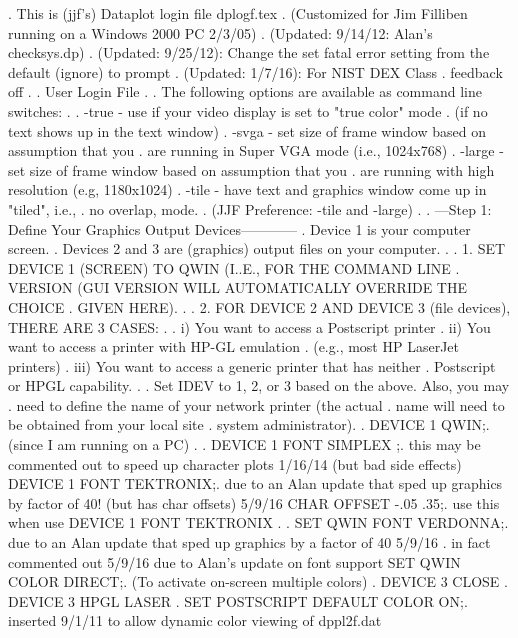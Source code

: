 . This is (jjf's) Dataplot login file dplogf.tex
. (Customized for Jim Filliben running on a Windows 2000 PC  2/3/05)
. (Updated: 9/14/12:  Alan's checksys.dp)
. (Updated: 9/25/12): Change the   set fatal error   setting from the default (ignore) to prompt
. (Updated: 1/7/16):  For NIST DEX Class
.
feedback off
.
.  User Login File
.
.  The following options are available as command line switches:
.
.  -true    - use if your video display is set to "true color" mode
.             (if no text shows up in the text window)
.  -svga    - set size of frame window based on assumption that you
.             are running in Super VGA mode (i.e., 1024x768)
.  -large   - set size of frame window based on assumption that you
.             are running with high resolution (e.g, 1180x1024)
.  -tile    - have text and graphics window come up in "tiled", i.e.,
.             no overlap, mode.
.  (JJF Preference: -tile and -large)
.
. ---Step 1: Define Your Graphics Output Devices------------
.      Device 1 is your computer screen.
.      Devices 2 and 3 are (graphics) output files on your computer.
.
.         1. SET DEVICE 1 (SCREEN) TO QWIN (I..E., FOR THE COMMAND LINE
.            VERSION (GUI VERSION WILL AUTOMATICALLY OVERRIDE THE CHOICE
.            GIVEN HERE).
.
.         2. FOR DEVICE 2 AND DEVICE 3 (file devices), THERE ARE 3 CASES:
.
.              i) You want to access a Postscript printer
.             ii) You want to access a printer with HP-GL emulation
.                 (e.g., most HP LaserJet printers)
.            iii) You want to access a generic printer that has neither
.                 Postscript or HPGL capability.
.
.            Set IDEV to 1, 2, or 3 based on the above.  Also, you may
.            need to define the name of your network printer (the actual
.            name will need to be obtained from your local site
.            system administrator).
.
DEVICE 1 QWIN;. (since I am running on a PC)
.
. DEVICE 1 FONT SIMPLEX   ;. this may be commented out to speed up character plots 1/16/14 (but bad side effects)
DEVICE 1 FONT TEKTRONIX;. due to an Alan update that sped up graphics by factor of 40! (but has char offsets) 5/9/16
CHAR OFFSET -.05 .35;. use this when use DEVICE 1 FONT TEKTRONIX
.
. SET QWIN FONT VERDONNA;.  due to an Alan update that sped up graphics by a factor of 40   5/9/16
.          in fact commented out 5/9/16 due to Alan's update on font support
SET QWIN COLOR DIRECT;. (To activate on-screen multiple colors)
. DEVICE 3 CLOSE
. DEVICE 3 HPGL LASER
.
SET POSTSCRIPT DEFAULT COLOR ON;. inserted 9/1/11 to allow dynamic color viewing of dppl2f.dat
